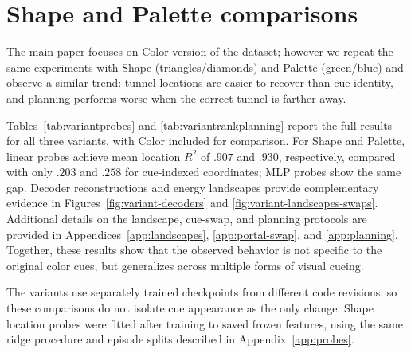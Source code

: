 \section{Shape and Palette comparisons}
\label{app:variants}

The main paper focuses on Color version of the dataset; however we repeat the same experiments with Shape
(triangles/diamonds) and Palette (green/blue) and observe a similar trend: tunnel locations are easier to recover than cue identity, and planning performs worse when the correct tunnel is farther away. 

Tables~\ref{tab:variantprobes} and \ref{tab:variantrankplanning} report the
full results for all three variants, with Color included for comparison.
For Shape and Palette, linear probes achieve mean location $R^2$ of $.907$
and $.930$, respectively, compared with only $.203$ and $.258$ for
cue-indexed coordinates; MLP probes show the same gap. Decoder
reconstructions and energy landscapes provide complementary evidence in
Figures~\ref{fig:variant-decoders} and
\ref{fig:variant-landscapes-swaps}. Additional details on the landscape,
cue-swap, and planning protocols are provided in
Appendices~\ref{app:landscapes}, \ref{app:portal-swap}, and
\ref{app:planning}. Together, these results show that the observed behavior is not specific to
the original color cues, but generalizes across multiple forms of visual
cueing.

The variants use separately trained checkpoints from different code revisions,
so these comparisons do not isolate cue appearance as the only change.
Shape location probes were fitted after training to saved frozen features,
using the same ridge procedure and episode splits described in
Appendix~\ref{app:probes}.
 
